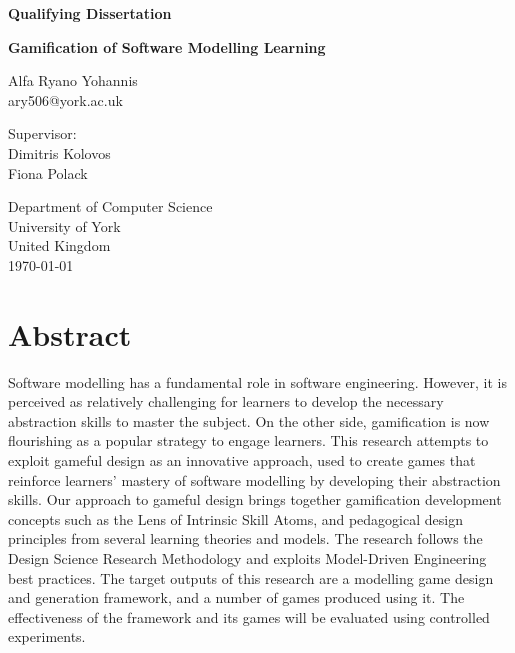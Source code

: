 \documentclass[12pt, a4paper]{report}
\begin{document}
\begin{titlepage}
    \begin{center}

\textbf{Qualifying Dissertation}
\vspace{1cm}

\textbf{\large Gamification of Software Modelling Learning}
\vspace{1cm}

Alfa Ryano Yohannis\\
ary506@york.ac.uk
\vspace{1cm}

Supervisor:\\
Dimitris Kolovos\\
Fiona Polack\\
\vspace{1cm}

Department of Computer Science\\
University of York\\
United Kingdom\\
\vspace{1cm}
\today
        
\vfill
         
\end{center}
\end{titlepage}

\tableofcontents
{}

\chapter{Abstract}
Software modelling has a fundamental role in software engineering. However, it is perceived as relatively challenging for learners to develop the necessary abstraction skills to master the subject. On the other side, gamification is now flourishing as a popular strategy to engage learners. This research attempts to exploit gameful design as an innovative approach, used to create games that reinforce learners' mastery of software modelling by developing their abstraction skills. Our approach to gameful design brings together gamification development concepts such as the Lens of Intrinsic Skill Atoms, and pedagogical design principles from several learning theories and models. The research follows the Design Science Research Methodology and exploits Model-Driven Engineering best practices. The target outputs of this research are a modelling game design and generation framework, and a number of games produced using it. The effectiveness of the framework and its games will be evaluated using controlled experiments.
\end{document}
